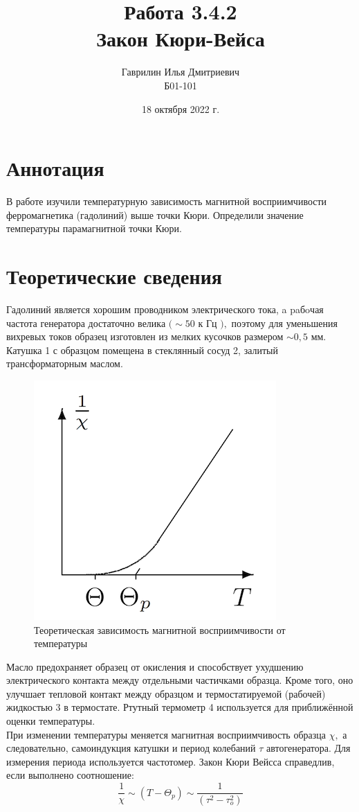 \documentclass[a4paper, 12pt]{article}%
\date{18 октября 2022 г.}
\author{Гаврилин Илья Дмитриевич \\
	Б01-101}
\title{\textbf{Работа 3.4.2 \\ 
		Закон Кюри-Вейса}}
\begin{document}
	\maketitle
	\section{Аннотация}
	В работе изучили температурную зависимость магнитной восприимчивости ферромагнетика (гадолиний) выше точки Кюри. Определили значение температуры парамагнитной точки Кюри.
	\section{Теоретические сведения}
	Гадолиний является хорошим проводником электрического тока, a paбoчая частота генератора достаточно велика $(\sim 50$ к Гц $),$ поэтому для уменьшения вихревых токов образец изготовлен из мелких кусочков размером $\sim 0,5$ мм. Катушка 1 с образцом помещена в стеклянный сосуд 2, залитый трансформаторным маслом. 
	\begin{figure}
		\centering
		\includegraphics[width=0.3\linewidth]{graph}
		\caption{Теоретическая зависимость магнитной восприимчивости от температуры}
		\label{fig:graph}
	\end{figure}
	
	Масло предохраняет образец от окисления и способствует
	ухудшению электрического контакта между отдельными частичками образца. Кроме того, оно улучшает тепловой контакт между образцом и термостатируемой (рабочей) жидкостью 3 в термостате. Ртутный термометр 4 используется для приближённой оценки температуры.\\
	При изменении температуры меняется магнитная восприимчивость образца $\chi,$ а следовательно, самоиндукция катушки и период колебаний $\tau$ автогенератора. Для измерения периода используется частотомер.
	Закон Кюри Вейсса справедлив, если выполнено соотношение: 
	\begin{equation*}
		\frac{1}{\chi} \sim\left(T-\Theta_{p}\right) \sim \frac{1}{\left(\tau^{2}-\tau_{o}^{2}\right)}
	\end{equation*}
	
\end{document}
